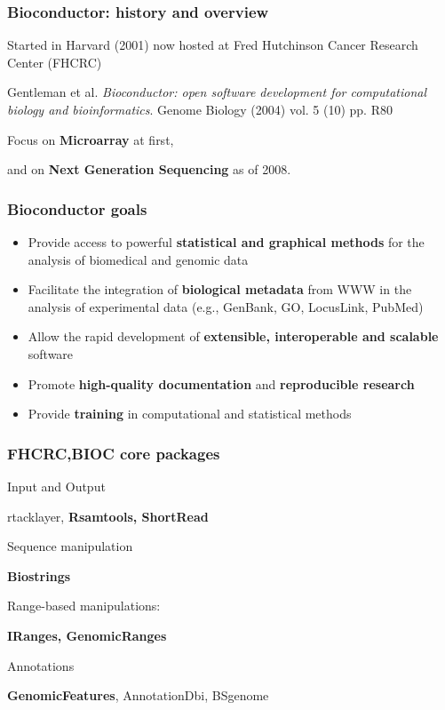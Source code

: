 \documentclass[xcolor=dvipsnames]{beamer}
\begin{document}
  \begin{frame}
     \frametitle{Bioconductor: history and overview}
      \bit
    \item  Started in Harvard (2001) now hosted at Fred Hutchinson Cancer Research Center (FHCRC)
     \item Gentleman et al. \emph{Bioconductor: open software development for computational biology and bioinformatics}. Genome Biology (2004) vol. 5 (10) pp. R80
   \item Focus on \textbf{Microarray} at first, 
   \item and on \textbf{Next Generation Sequencing} as of 2008.
     \eit
    \end{frame}
     
    \begin{frame}
\frametitle{Bioconductor goals}
      \begin{itemize}
      \item Provide access to powerful\textbf{ statistical and graphical methods} for the analysis of biomedical and genomic data
      \item Facilitate the integration of \textbf{biological metadata} from WWW in the analysis of experimental data (e.g., GenBank, GO, LocusLink, PubMed)
      \item Allow the rapid development of \textbf{extensible, interoperable and scalable} software
      \item Promote \textbf{high-quality documentation} and \textbf{reproducible research}
      \item Provide \textbf{training} in computational and statistical methods
      \end{itemize}
    \end{frame}
  
     \begin{frame}
     \frametitle{FHCRC,BIOC core packages}
      \bit
	  \item Input and Output
	    \bit
		\item rtacklayer, \textbf{Rsamtools, ShortRead}
	    \eit
	  \item Sequence manipulation
	    \bit
		\item \textbf{Biostrings}
	    \eit
	  \item Range-based manipulations:
	    \bit
		\item \textbf{IRanges, GenomicRanges}
	    \eit
	  \item Annotations
	    \bit
		\item \textbf{GenomicFeatures}, AnnotationDbi, BSgenome
	    \eit
      \eit
     \end{frame}
     
\end{document}
